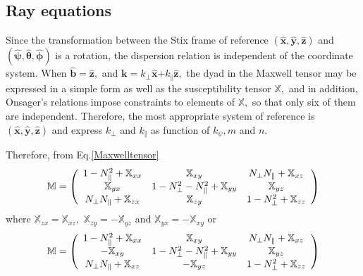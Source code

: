 \documentclass[a4paper,12pt]{article}%
\begin{document}
\subsection{Ray equations}

Since the transformation between the Stix frame of reference $\left(
\widehat{\mathbf{x}}\mathbf{,}\widehat{\mathbf{y}}\mathbf{,}\widehat
{\mathbf{z}}\right)  $ and $\left(  \widehat{\mathbf{\psi}}\mathbf{,}%
\widehat{\mathbf{\theta}}\mathbf{,}\widehat{\mathbf{\phi}}\right)  $ is a
rotation, the dispersion relation is independent of the coordinate system.
When $\widehat{\mathbf{b}}=\widehat{\mathbf{z}},$ and $\mathbf{k=}k_{\bot
}\widehat{\mathbf{x}}\mathbf{+}k_{\Vert}\widehat{\mathbf{z}},$ the dyad in the
Maxwell tensor may be expressed in a simple form as well as the susceptibility
tensor $\mathbb{X,}$ and in addition, Onsager's relations impose constraints
to elements of $\mathbb{X,}$ so that only six of them are independent.
Therefore, the most appropriate system of reference is $\left(  \widehat
{\mathbf{x}}\mathbf{,}\widehat{\mathbf{y}}\mathbf{,}\widehat{\mathbf{z}%
}\right)  $ and express $k_{\bot}$ and $k_{\Vert}$ as function of $k_{\psi},m$
and $n$.

Therefore, from Eq.\ref{Maxwelltensor}
\begin{equation}
\mathbb{M}=\left(
\begin{array}
[c]{ccc}%
1-N_{\Vert}^{2}+\mathbb{X}_{xx} & \mathbb{X}_{xy} & N_{\bot}N_{\Vert
}+\mathbb{X}_{xz}\\
\mathbb{X}_{yx} & 1-N_{\bot}^{2}-N_{\Vert}^{2}+\mathbb{X}_{yy} &
\mathbb{X}_{yz}\\
N_{\bot}N_{\Vert}+\mathbb{X}_{zx} & \mathbb{X}_{zy} & 1-N_{\bot}%
^{2}+\mathbb{X}_{zz}%
\end{array}
\right)
\end{equation}
where $\mathbb{X}_{zx}=\mathbb{X}_{xz},$ $\mathbb{X}_{zy}=-\mathbb{X}_{yz}$
and $\mathbb{X}_{yx}=-\mathbb{X}_{xy}$ or%
\begin{equation}
\mathbb{M}=\left(
\begin{array}
[c]{ccc}%
1-N_{\Vert}^{2}+\mathbb{X}_{xx} & \mathbb{X}_{xy} & N_{\bot}N_{\Vert
}+\mathbb{X}_{xz}\\
-\mathbb{X}_{xy} & 1-N_{\bot}^{2}-N_{\Vert}^{2}+\mathbb{X}_{yy} &
\mathbb{X}_{yz}\\
N_{\bot}N_{\Vert}+\mathbb{X}_{xz} & -\mathbb{X}_{yz} & 1-N_{\bot}%
^{2}+\mathbb{X}_{zz}%
\end{array}
\right)
\end{equation}
\end{document}
